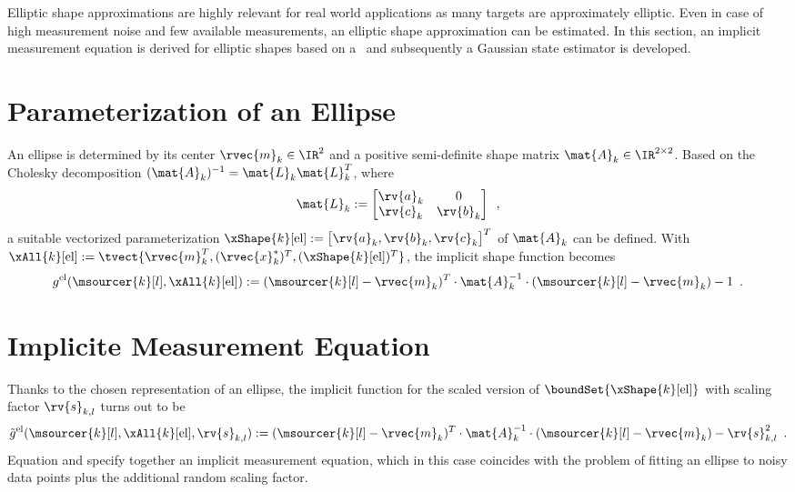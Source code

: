 \documentclass[preprint,1p,11pt]{ISAS_IR}
\begin{document}
Elliptic shape approximations are highly relevant for real world applications as many targets are approximately elliptic.
Even in case of high measurement noise and few available measurements, an elliptic shape approximation  can be estimated.
In this section, an implicit measurement equation is derived for  elliptic shapes based on a  \rhm\ and subsequently a Gaussian state estimator is developed. 


\section{Parameterization of an Ellipse}\label{sec:implict_rep_ellipse}
An ellipse is determined by its center $\rvec{m}_k \in \IR^2$ and a positive semi-definite  shape matrix $\mat{A}_k\in \IR^{2\times2}$.
Based on the  Cholesky decomposition $(\mat{A}_k)^{-1}=\mat{L}_k \mat{L}_k^T$, where
\begin{equation}\label{eqn:shape_para}
 \mat{L}_k:= \begin{bmatrix} \rv{a}_k & 0 \\   \rv{c}_k &  \rv{b}_k  \end{bmatrix} \enspace ,  
\end{equation}
a suitable vectorized parameterization  $ \xShape{k}[\text{el}]:= \begin{bmatrix}\rv{a}_k, \rv{b}_k, \rv{c}_k\end{bmatrix}^T $ of  $\mat{A}_k$    can be defined.
With $\xAll{k}[\text{el}]:=\tvect{ \rvec{m}^T_k, (\rvec{x}^*_k)^T, (\xShape{k}[\text{el}])^T }$,  the implicit shape function becomes 
$$g^{\text{el}}(\msourcer{k}[l],\xAll{k}[\text{el}]):= (\msourcer{k}[l] - \rvec{m}_k)^T \cdot  \mat{A}_k^{-1}      \cdot  (\msourcer{k}[l]- \rvec{m}_k) -1\enspace .  $$

\section{Implicite Measurement Equation}
Thanks to the chosen representation of an ellipse, the  implicit function for the scaled version of $\boundSet{\xShape{k}[\text{el}]}$ with scaling factor $\rv{s}_{k,l}$  turns out to be
\begin{equation}\label{eqn:meas_eqn_elliptic1}
\tilde{g}^{\text{el}}(\msourcer{k}[l],\xAll{k}[\text{el}], \rv{s}_{k,l}):= (\msourcer{k}[l] - \rvec{m}_k)^T \cdot  \mat{A}_k^{-1}      \cdot  (\msourcer{k}[l]- \rvec{m}_k) -\rv{s}_{k,l}^2\enspace .  
\end{equation}
 Equation  and    specify together an implicit measurement equation, which in this case coincides  with the problem of fitting an ellipse to noisy data points plus the additional random scaling factor.
 
\end{document}
